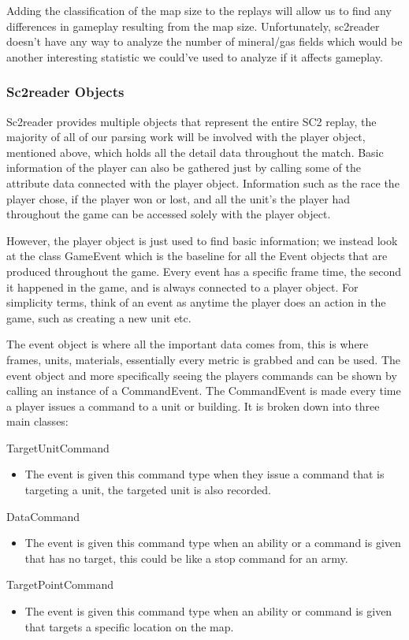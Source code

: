 \documentclass[a4paper,12pt]{report}
\begin{document}
Adding the classification of the map size to the replays will allow us to find any differences in gameplay resulting from the map size. Unfortunately, sc2reader doesn’t have any way to analyze the number of mineral/gas fields which would be another interesting statistic we could’ve used to analyze if it affects gameplay.

\subsubsection{Sc2reader Objects}
Sc2reader provides multiple objects that represent the entire SC2 replay, the majority of all of our parsing work will be involved with the player object, mentioned above,  which holds all the detail data throughout the match. Basic information of the player can also be gathered just by calling some of the attribute data connected with the player object. Information such as the race the player chose, if the player won or lost, and all the unit’s the player had throughout the game can be accessed solely with the player object.

However, the player object is just used to find basic information; we instead look at the class GameEvent which is the baseline for all the Event objects that are produced throughout the game. Every event has a specific frame time, the second it happened in the game, and is always connected to a player object. For simplicity terms, think of an event as anytime the player does an action in the game, such as creating a new unit etc.

The event object is where all the important data comes from, this is where frames, units, materials, essentially every metric is grabbed and can be used. The event object and more specifically seeing the players commands can be shown by calling an instance of a CommandEvent. The CommandEvent is made every time a player issues a command to a unit or building. It is broken down into three main classes:

TargetUnitCommand
\begin{itemize}[,]
    \setlength\itemsep{-.1cm}
    \item The event is given this command type when they issue a command that is targeting a unit, the targeted unit is also recorded.
\end{itemize}
\vspace*{-.4cm}
DataCommand
\begin{itemize}[,]
    \setlength\itemsep{-.1cm}
    \item The event is given this command type when an ability or a command is given that has no target, this could be like a stop command for an army.
\end{itemize}
\vspace*{-.4cm}
TargetPointCommand
\begin{itemize}[,]
    \setlength\itemsep{-.1cm}
    \item The event is given this command type when an ability or command is given that targets a specific location on the map.
\end{itemize}
\end{document}
